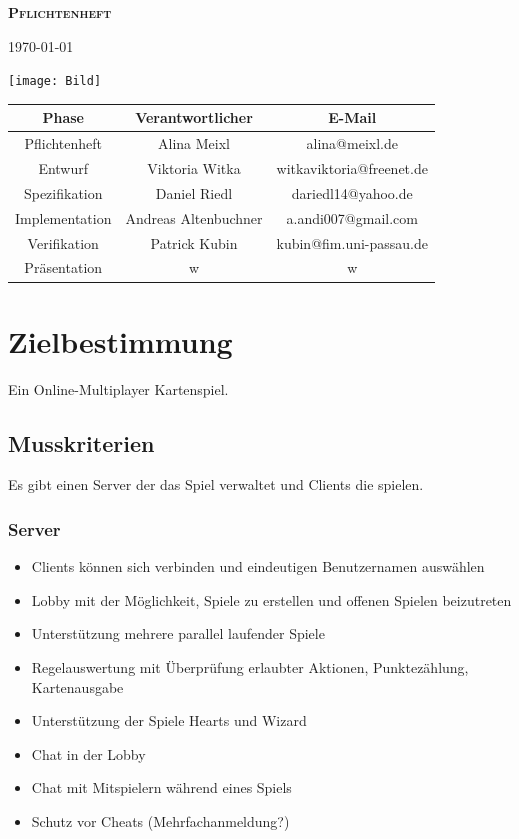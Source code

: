 \documentclass{article}
\begin{document}
\begin{titlepage}

\begin{center}
\textbf{\textsc{\LARGE Pflichtenheft}}

{\large \today}

\vspace{2cm}
\texttt{[image: Bild]}

\vspace{2cm}

\begin{tabular}{|c|c|c|}\hline
   Phase & Verantwortlicher & E-Mail \\ \hline\hline
   Pflichtenheft & Alina  Meixl  &  alina@meixl.de \\ \hline
   Entwurf & Viktoria Witka & witkaviktoria@freenet.de \\ \hline
   Spezifikation & Daniel Riedl & dariedl14@yahoo.de \\ \hline
   Implementation & Andreas Altenbuchner& a.andi007@gmail.com\\ \hline
   Verifikation &Patrick Kubin & kubin@fim.uni-passau.de\\ \hline
   Präsentation & w& w\\ \hline
 \end{tabular}

\end{center}

\end{titlepage}


\tableofcontents

\section{Zielbestimmung}
Ein Online-Multiplayer Kartenspiel.

\subsection{Musskriterien}
Es gibt einen \gls{Server} der das Spiel verwaltet und \glspl{Client} die spielen.
\subsubsection{\gls{Server}}
\begin{itemize}
	\item \glspl{Client} können sich verbinden und eindeutigen Benutzernamen auswählen
	\item \gls{Lobby} mit der Möglichkeit, Spiele zu erstellen und offenen Spielen beizutreten
	\item Unterstützung mehrere parallel laufender Spiele
	\item Regelauswertung mit Überprüfung erlaubter Aktionen, Punktezählung, Kartenausgabe
	\item Unterstützung der Spiele Hearts und Wizard
	\item Chat in der \gls{Lobby}
	\item Chat mit Mitspielern während eines Spiels
	\item Schutz vor Cheats (Mehrfachanmeldung?)
\end{itemize}
\end{document}
